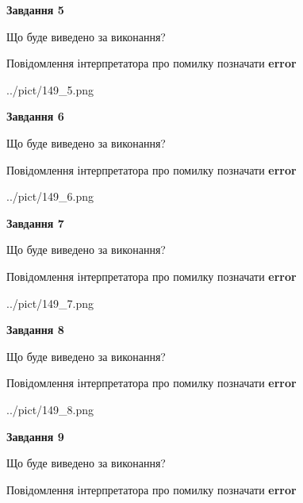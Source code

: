 \documentclass[11pt, ukrainian]{article}
\begin{document}
{\begin {large}
{\begin {center}\textbf{Завдання 5}\end {center}}\par
Що буде виведено за виконання? \par
Повідомлення інтерпретатора про помилку позначати \textbf{error}

\begin{center}
	{../pict/149_5.png}
\end{center}
\newpage

{\begin {center}\textbf{Завдання 6}\end {center}}\par
Що буде виведено за виконання? \par
Повідомлення інтерпретатора про помилку позначати \textbf{error}

\begin{center}
	{../pict/149_6.png}
\end{center}
\newpage

{\begin {center}\textbf{Завдання 7}\end {center}}\par
Що буде виведено за виконання? \par
Повідомлення інтерпретатора про помилку позначати \textbf{error}

\begin{center}
	{../pict/149_7.png}
\end{center}
\newpage

{\begin {center}\textbf{Завдання 8}\end {center}}\par
Що буде виведено за виконання? \par
Повідомлення інтерпретатора про помилку позначати \textbf{error}

\begin{center}
	{../pict/149_8.png}
\end{center}
\newpage

{\begin {center}\textbf{Завдання 9}\end {center}}\par
Що буде виведено за виконання? \par
Повідомлення інтерпретатора про помилку позначати \textbf{error}


\end{large}}
\end{document}
